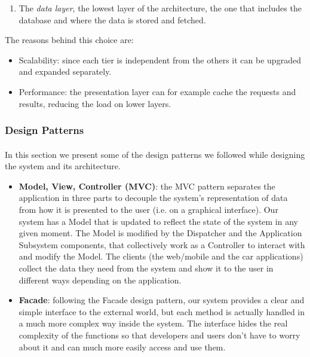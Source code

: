 \documentclass[english]{article}
\begin{document}
\begin{itemize}
{\begin{enumerate}
  		\item{The \textit{data layer}, the lowest layer of the architecture, the one that includes the database and where the data is stored and fetched.}
  	\end{enumerate}
  	The reasons behind this choice are:
  	\begin{itemize}
  		\item{Scalability: since each tier is independent from the others it can be upgraded and expanded separately.}
  		\item{Performance: the presentation layer can for example cache the requests and results, reducing the load on lower layers.}
  	\end{itemize}
  }
  
\end{itemize}


\subsubsection{Design Patterns}

\paragraph{}
In this section we present some of the design patterns we followed while designing the system and its architecture.

\begin{itemize}
	\item{\textbf{Model, View, Controller (MVC)}: 
		the MVC pattern separates the application in three parts to decouple the system's representation of data from how it is presented to the user (i.e. on a graphical interface).
		Our system has a Model that is updated to reflect the state of the system in any given moment. The Model is modified by the Dispatcher and the Application Subsystem components, that collectively work as a Controller to interact with and modify the Model. The clients (the web/mobile and the car applications) collect the data they need from the system and show it to the user  in different ways depending on the application.}

	\item{\textbf{Facade}: following the Facade design pattern, our system provides a clear and simple interface to the external world, but each method is actually handled in a much more complex way inside the system. The interface hides the real complexity of the functions so that developers and users don't have to worry about it and can much more easily access and use them.}

\end{itemize}
\end{document}
